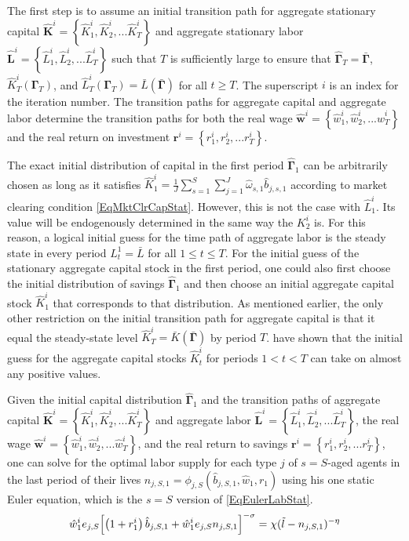 \documentclass[letterpaper,12pt]{article}
\theoremstyle{definition}
\begin{document}
  The first step is to assume an initial transition path for aggregate stationary capital $\bm{\hat{K}}^i = \left\{\hat{K}_1^i,\hat{K}_2^i,...\hat{K}_T^i\right\}$ and aggregate stationary labor $\bm{\hat{L}}^i = \left\{\hat{L}_1^i,\hat{L}_2^i,...\hat{L}_T^i\right\}$ such that $T$ is sufficiently large to ensure that $\bm{\hat{\Gamma}}_T = \bar{\bm{\Gamma}}$, $\hat{K}_T^i\left(\bm{\Gamma}_T\right)$, and $\hat{L}_T^i\left(\bm{\Gamma}_T\right) = \bar{L}\left(\bar{\bm{\Gamma}}\right)$ for all $t\geq T$. The superscript $i$ is an index for the iteration number. The transition paths for aggregate capital and aggregate labor determine the transition paths for both the real wage $\bm{\hat{w}}^i = \left\{\hat{w}_1^i,\hat{w}_2^i,...\hat{w}_T^i\right\}$ and the real return on investment $\bm{r}^i = \left\{r_1^i,r_2^i,...r_T^i\right\}$.

  The exact initial distribution of capital in the first period $\bm{\hat{\Gamma}}_1$ can be arbitrarily chosen as long as it satisfies $\hat{K}_1^i = \frac{1}{J}\sum_{s=1}^{S}\sum_{j=1}^{J}\hat{\omega}_{s,1}\hat{b}_{j,s,1}$ according to market clearing condition \eqref{EqMktClrCapStat}. However, this is not the case with $\hat{L}_1^i$. Its value will be endogenously determined in the same way the $K_2^i$ is. For this reason, a logical initial guess for the time path of aggregate labor is the steady state in every period $L_t^1 = \bar{L}$ for all $1\leq t\leq T$. For the initial guess of the stationary aggregate capital stock in the first period, one could also first choose the initial distribution of savings $\bm{\hat{\Gamma}}_1$ and then choose an initial aggregate capital stock $\hat{K}_1^i$ that corresponds to that distribution. As mentioned earlier, the only other restriction on the initial transition path for aggregate capital is that it equal the steady-state level $\hat{K}_T^i = \bar{K}\left(\bm{\bar{\Gamma}}\right)$ by period $T$. \citet{EvansPhillips:2014} have shown that the initial guess for the aggregate capital stocks $\hat{K}_t^i$ for periods $1<t<T$ can take on almost any positive values.

  Given the initial capital distribution $\bm{\hat{\Gamma}}_1$ and the transition paths of aggregate capital $\bm{\hat{K}}^i = \left\{\hat{K}_1^i,\hat{K}_2^i,...\hat{K}_T^i\right\}$ and aggregate labor $\bm{\hat{L}}^i = \left\{\hat{L}_1^i,\hat{L}_2^i,...\hat{L}_T^i\right\}$, the real wage $\bm{\hat{w}}^i = \left\{\hat{w}_1^i,\hat{w}_2^i,...\hat{w}_T^i\right\}$, and the real return to savings $\bm{r}^i = \left\{r_1^i,r_2^i,...r_T^i\right\}$, one can solve for the optimal labor supply for each type $j$ of $s=S$-aged agents in the last period of their lives $n_{j,S,1}=\phi_{j,S}(\hat{b}_{j,S,1},\hat{w}_1,r_1)$ using his one static Euler equation, which is the $s=S$ version of \eqref{EqEulerLabStat}.
  \begin{equation}\label{EqEulerSlabt1}
    \hat{w}^i_1 e_{j,S}\Bigl[\left(1+r^i_1\right)\hat{b}_{j,S,1} + \hat{w}^i_1 e_{j,S}n_{j,S,1}\Bigr]^{-\sigma} = \chi(\tilde{l} - n_{j,S,1})^{-\eta}
  \end{equation}
\end{document}
